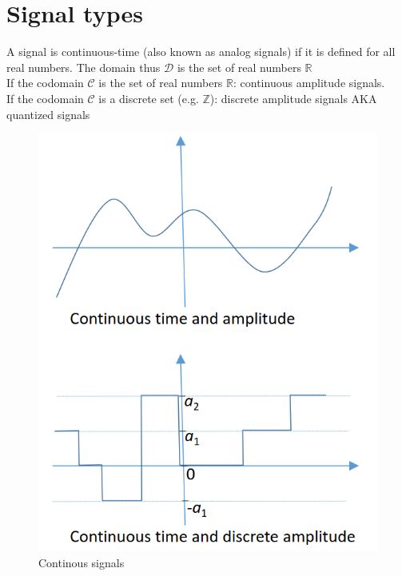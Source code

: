 \section{Signal types}
\begin{paracol}{2}
   
   \begin{definition}
      A signal is continuous-time (also known as analog signals) if it is defined for all real numbers.
      The domain thus $\mathcal{D}$ is the set of real numbers $\mathbb{R}$\\
      If the codomain $\mathcal{C}$ is the set of real numbers $\mathbb{R}$:
      continuous amplitude signals.\\
      If the codomain $\mathcal{C}$ is a discrete set (e.g. $\mathbb{Z}$): discrete
      amplitude signals
      AKA quantized signals
   \end{definition}

   \switchcolumn

   \begin{figure}[htbp]
      \centering
      \includegraphics{images/signals_continuous.png}
      \caption{Continous signals}
      \label{fig:signals_continuous}
   \end{figure}
\end{paracol}

